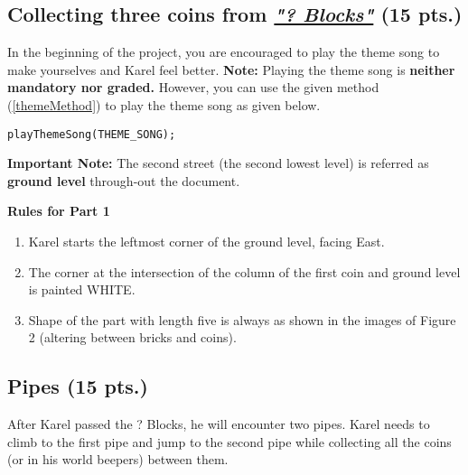 \documentclass[a4paper]{article}
\begin{document}
\subsection{Collecting three coins from  \emph{\href{https://www.mariowiki.com/\%3F_Block}{"? Blocks"}} (15 pts.)}
In the beginning of the project, you are encouraged to play the theme song to make yourselves and Karel feel better.
\newline
\noindent \textbf{Note:} Playing the theme song is \textbf{neither mandatory nor graded.} However, you can use the given method (\ref{themeMethod}) to play the theme song as given below.

\begin{lstlisting} 
playThemeSong(THEME_SONG);
\end{lstlisting} 

\noindent \textbf{Important Note:} The second street (the second lowest level) is referred as \textbf{ground level} through-out the document.



\textbf{Rules for Part 1}
\begin{enumerate}
\item Karel starts the leftmost corner of the ground level, facing East.
\item The corner at the intersection of the column of the first coin and ground level is painted WHITE.
\item Shape of the part with length five is always as shown in the images of Figure 2 (altering between bricks
and coins).
\end{enumerate}


\subsection{Pipes (15 pts.)}
After Karel passed the ? Blocks, he will encounter two pipes. Karel needs to climb to the first pipe and jump to the second pipe while collecting all the coins (or in his world beepers) between them.



\end{document}

